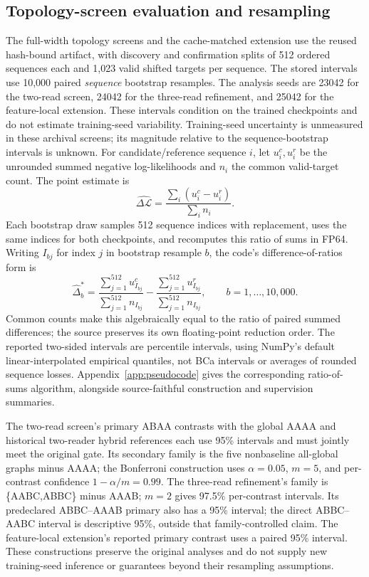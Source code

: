 \documentclass[11pt,letterpaper]{article}
\newcommand{\route}[1]{\textsf{#1}}
\newcommand{\Loss}{\mathcal{L}}
\begin{document}
\subsection{Topology-screen evaluation and resampling}
\label{app:archival-evaluation}
The full-width topology screens and the cache-matched extension use the
reused hash-bound artifact, with discovery and confirmation
splits of 512 ordered sequences each and 1,023 valid shifted targets per sequence.
The stored intervals use 10,000 paired \emph{sequence} bootstrap resamples.
The analysis seeds are 23042 for the two-read screen, 24042 for the three-read
refinement, and 25042 for the feature-local extension. These intervals condition
on the trained checkpoints and do not estimate training-seed variability.
Training-seed uncertainty is unmeasured in these archival screens; its
magnitude relative to the sequence-bootstrap intervals is unknown.
For candidate/reference sequence $i$, let $u_i^c,u_i^r$ be the unrounded summed
negative log-likelihoods and $n_i$ the common valid-target count. The point
estimate is
\begin{equation}
 \widehat{\Delta\Loss}=\frac{\sum_i(u_i^c-u_i^r)}{\sum_i n_i}.
 \label{eq:weighted-delta}
\end{equation}
Each bootstrap draw samples 512 sequence indices with replacement, uses the
same indices for both checkpoints, and recomputes this ratio of sums in FP64.
Writing $I_{bj}$ for index $j$ in bootstrap resample $b$, the code's
difference-of-ratios form is
\begin{equation}
 \widehat\Delta_b^*=
 \frac{\sum_{j=1}^{512}u^c_{I_{bj}}}{\sum_{j=1}^{512}n_{I_{bj}}}
 -\frac{\sum_{j=1}^{512}u^r_{I_{bj}}}{\sum_{j=1}^{512}n_{I_{bj}}},
 \qquad b=1,\ldots,10{,}000.
 \label{eq:paired-bootstrap}
\end{equation}
Common counts make this algebraically equal to the ratio of paired summed
differences; the source preserves its own floating-point reduction order.
The reported two-sided intervals are percentile intervals, using NumPy's
default linear-interpolated empirical quantiles, not BCa intervals or averages
of rounded sequence losses.
Appendix~\ref{app:pseudocode} gives the corresponding ratio-of-sums algorithm,
alongside source-faithful construction and supervision summaries.

The two-read screen's primary \route{ABAA} contrasts with the global \route{AAAA}
and historical two-reader hybrid references each use 95\% intervals and must
jointly meet the original gate. Its secondary family is the five nonbaseline all-global graphs
minus \route{AAAA}; the Bonferroni construction uses
$\alpha=0.05$, $m=5$, and per-contrast confidence $1-\alpha/m=0.99$.
The three-read refinement's family is \{\route{AABC},\route{ABBC}\} minus
\route{AAAB}; $m=2$ gives 97.5\% per-contrast intervals. Its predeclared
\route{ABBC}--\route{AAAB} primary also has a 95\% interval; the direct
\route{ABBC}--\route{AABC} interval is descriptive 95\%, outside that
family-controlled claim. The feature-local extension's reported primary contrast uses a
paired 95\% interval. These constructions preserve the original analyses and
do not supply new training-seed inference or guarantees beyond their
resampling assumptions.
\end{document}
